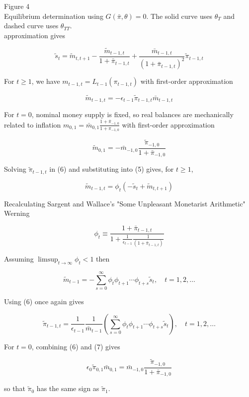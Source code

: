 \documentclass[10pt]{article}
\begin{document}
Figure 4\\
Equilibrium determination using $G(\bar{\pi}, \theta)=0$. The solid curve uses $\theta_{T}$ and dashed curve uses $\theta_{T T}$.\\
approximation gives

\begin{equation*}
\tilde{s}_{t}=\tilde{m}_{t, t+1}-\frac{\tilde{m}_{t-1, t}}{1+\bar{\pi}_{t-1, t}}+\frac{\bar{m}_{t-1, t}}{\left(1+\bar{\pi}_{t-1, t}\right)^{2}} \tilde{\pi}_{t-1, t} \tag{5}
\end{equation*}

For $t \geq 1$, we have $m_{t-1, t}=L_{t-1}\left(\pi_{t-1, t}\right)$ with first-order approximation

\begin{equation*}
\tilde{m}_{t-1, t}=-\epsilon_{t-1} \tilde{\pi}_{t-1, t} \bar{m}_{t-1, t} \tag{6}
\end{equation*}

For $t=0$, nominal money supply is fixed, so real balances are mechanically related to inflation $m_{0,1}=\bar{m}_{0,1} \frac{1+\bar{\pi}_{-1,0}}{1+\pi_{-1,0}}$ with first-order approximation

\begin{equation*}
\tilde{m}_{0,1}=-\bar{m}_{-1,0} \frac{\tilde{\pi}_{-1,0}}{1+\bar{\pi}_{-1,0}} \tag{7}
\end{equation*}

Solving $\tilde{\pi}_{t-1, t}$ in (6) and substituting into (5) gives, for $t \geq 1$,

\begin{equation*}
\tilde{m}_{t-1, t}=\phi_{t}\left(-\tilde{s}_{t}+\tilde{m}_{t, t+1}\right)
\end{equation*}

Recalculating Sargent and Wallace's "Some Unpleasant Monetarist Arithmetic" Werning

\begin{equation*}
\phi_{t} \equiv \frac{1+\bar{\pi}_{t-1, t}}{1+\frac{1}{\epsilon_{t-1}} \frac{1}{\left(1+\bar{\pi}_{t-1, t}\right)}}
\end{equation*}

Assuming $\limsup _{t \rightarrow \infty} \phi_{t}<1$ then

\begin{equation*}
\tilde{m}_{t-1}=-\sum_{s=0}^{\infty} \phi_{t} \phi_{t+1} \cdots \phi_{t+s} \tilde{s}_{t}, \quad t=1,2, \ldots
\end{equation*}

Using (6) once again gives

\begin{equation*}
\tilde{\pi}_{t-1, t}=\frac{1}{\epsilon_{t-1}} \frac{1}{\bar{m}_{t-1}}\left(\sum_{s=0}^{\infty} \phi_{t} \phi_{t+1} \cdots \phi_{t+s} \tilde{s}_{t}\right), \quad t=1,2, \ldots
\end{equation*}

For $t=0$, combining (6) and (7) gives

\begin{equation*}
\epsilon_{0} \tilde{\pi}_{0,1} \bar{m}_{0,1}=\bar{m}_{-1,0} \frac{\tilde{\pi}_{-1,0}}{1+\bar{\pi}_{-1,0}}
\end{equation*}

so that $\tilde{\pi}_{0}$ has the same sign as $\tilde{\pi}_{1}$.
\end{document}
